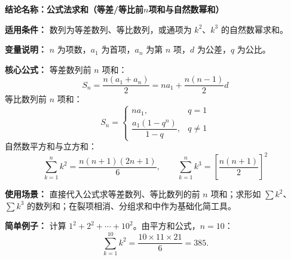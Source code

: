 \textbf{结论名称：}\textbf{公式法求和（等差/等比前\(n\)项和与自然数幂和）}

\textbf{适用条件：} 数列为等差数列、等比数列，或通项为 \(k^2\)、\(k^3\) 的自然数幂求和。

\textbf{变量说明：} \(n\) 为项数，\(a_1\) 为首项，\(a_n\) 为第 \(n\) 项，\(d\) 为公差，\(q\) 为公比。

\textbf{核心公式：}
等差数列前 \(n\) 项和：
\[
\boxed{S_n = \frac{n(a_1 + a_n)}{2} = na_1 + \frac{n(n-1)}{2}d}
\]
等比数列前 \(n\) 项和：
\[
\boxed{S_n = \begin{cases}
na_1, & q = 1 \\[4pt]
\dfrac{a_1(1 - q^n)}{1 - q}, & q \neq 1
\end{cases}}
\]
自然数平方和与立方和：
\[
\boxed{\sum_{k=1}^{n} k^2 = \frac{n(n+1)(2n+1)}{6}},\qquad
\boxed{\sum_{k=1}^{n} k^3 = \left[\frac{n(n+1)}{2}\right]^2}
\]

\textbf{使用场景：} 直接代入公式求等差数列、等比数列的前 \(n\) 项和；求形如 \(\sum k^2\)、\(\sum k^3\) 的数列和；在裂项相消、分组求和中作为基础化简工具。

\textbf{简单例子：} 计算 \(1^2 + 2^2 + \cdots + 10^2\)。由平方和公式，\(n=10\)：
\[
\sum_{k=1}^{10} k^2 = \frac{10 \times 11 \times 21}{6} = 385.
\]